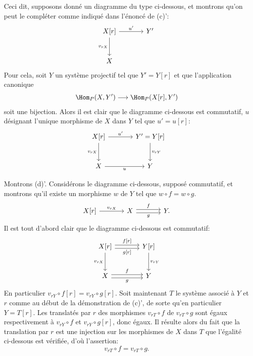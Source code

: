 Ceci dit, supposons donné un diagramme du type ci-dessous, et montrons qu'on peut le compléter comme indiqué dans l'énoncé de (c)':
\[
\begin{tikzcd}[column sep=large,row sep=large]
X[r] \arrow[r,"u'"] \arrow[d,"{v_{rX}}"'] & Y'\\
X
\end{tikzcd}
\]
Pour cela, soit $Y$ un système projectif tel que $Y'=Y[r]$ et que l'application canonique
\[
\Hom_P(X,Y')\longrightarrow\Hom_P(X[r],Y')
\]
soit une bijection. Alors il est clair que le diagramme ci-dessous est commutatif, $u$ désignant l'unique morphisme de $X$ dans $Y$ tel que $u'=u[r]$:
\[
\begin{tikzcd}[column sep=large,row sep=large]
X[r] \arrow[r,"u'"] \arrow[d,"{v_{rX}}"'] & Y'=Y[r] \arrow[d,"{v_{rY}}"]\\
X \arrow[r,"u"'] & Y
\end{tikzcd}
\]

Montrons (d)'. Considérons le diagramme ci-dessous, supposé commutatif, et montrons qu'il existe un morphisme $w$ de $Y$ tel que $w\circ f=w\circ g$.
\[
\begin{tikzcd}[column sep=large]
X[r] \arrow[r,"{v_{rX}}"] & X \arrow[r,shift left,"f"] \arrow[r,shift right,"g"'] & Y .
\end{tikzcd}
\]
Il est tout d'abord clair que le diagramme ci-dessous est commutatif:
\[
\begin{tikzcd}[column sep=large,row sep=large]
X[r] \arrow[r,shift left,"{f[r]}"] \arrow[r,shift right,"{g[r]}"'] \arrow[d,"{v_{rX}}"'] & Y[r] \arrow[d,"{v_{rY}}"]\\
X \arrow[r,shift left,"f"] \arrow[r,shift right,"g"'] & Y
\end{tikzcd}
\]
En particulier $v_{rY}\circ f[r]=v_{rY}\circ g[r]$. Soit maintenant $T$ le système associé à $Y$ et $r$ comme au début de la démonstration de (c)', de sorte qu'en
particulier $Y=T[r]$. Les translatés par $r$ des morphismes $v_{rT}\circ f$ de $v_{rT}\circ g$ sont égaux respectivement à $v_{rY}\circ f$ et $v_{rY}\circ g[r]$, donc égaux. Il résulte alors du fait que la translation par $r$ est une injection sur les morphismes de $X$ dans $T$ que l'égalité ci-dessous est vérifiée, d'où l'assertion:
\[
v_{rT}\circ f=v_{rT}\circ g.
\]

